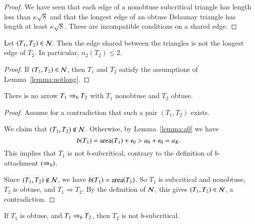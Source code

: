 \begin{proof} We have seen that each edge of a nonobtuse subcritical
  triangle has length less than $\kappa\sqrt8$ and that the longest edge of an
  obtuse Delaunay triangle has length at least $\kappa\sqrt{8}$.  These are
  incompatible conditions on a shared edge.
\end{proof}

\begin{lemma}  
  Let $(T_1,T_2)\in\mathcal N$.  Then the edge shared between the triangles is
  not the longest edge of $T_2$.  In particular, $n_2(T_2)\le 2$.
\end{lemma}

\begin{proof} If $(T_1,T_2)\in \mathcal N$, then $T_1$ and $T_2$ satisfy the
  assumptions of Lemma~\ref{lemma:notlong}.
\end{proof}

\begin{lemma}\label{lemma:no-ao} 
  There is no arrow $T_1 \Rightarrow_{b} T_2$ with $T_1$ nonobtuse and $T_2$
  obtuse.
\end{lemma}

\begin{proof}  
  Assume for a contradiction that such a pair $(T_1,T_2)$ exists.

  We claim that $(T_1,T_2)\not\in \mathcal N$.  Otherwise, by
  Lemma~\ref{lemma:a0} we have
\[
b(T_1) = {\operatorname{area}}(T_1) + \epsilon_0 > a_0 + \epsilon_0 =  a_K.
\]
This implies that $T_1$ is not $b$-subcritical, contrary to the
definition of $b$-attachment $(\Rightarrow_{b})$.

Since $(T_1,T_2)\not\in \mathcal N$, we have $b(T_1) = {\operatorname{area}}(T_1)$.  So $T_1$
is subcritical and nonobtuse, $T_2$ is obtuse, and $T_1\Rightarrow
T_2$.  By the definition of $\mathcal N$, this gives $(T_1,T_2)\in\mathcal N$, a
contradiction.
\end{proof}


\begin{lemma}\label{lemma:t2b}
  If $T_1$ is obtuse, and $T_1 \Rightarrow_{b} T_2$, then $T_2$ is not
  $b$-subcritical.
\end{lemma}

